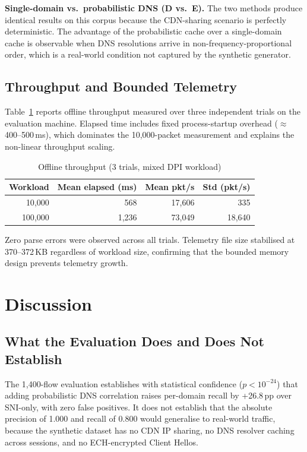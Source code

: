 \documentclass[conference]{IEEEtran}
\begin{document}
\textbf{Single-domain vs.\ probabilistic DNS (D vs.\ E).} The two
methods produce identical results on this corpus because the
CDN-sharing scenario is perfectly deterministic.
The advantage of the probabilistic cache over a single-domain cache
is observable when DNS resolutions arrive in non-frequency-proportional
order, which is a real-world condition not captured by the synthetic
generator.

\subsection{Throughput and Bounded Telemetry}

Table~\ref{tab:bench} reports offline throughput measured over
three independent trials on the evaluation machine.
Elapsed time includes fixed process-startup overhead
($\approx$400--500\,ms), which dominates the 10{,}000-packet
measurement and explains the non-linear throughput scaling.

\begin{table}[!t]
\centering
\caption{Offline throughput (3 trials, mixed DPI workload)}
\label{tab:bench}
\scriptsize
\begin{tabular}{|r|r|r|r|}
\hline
\textbf{Workload} & \textbf{Mean elapsed (ms)} & \textbf{Mean pkt/s} & \textbf{Std (pkt/s)} \\
\hline
10{,}000 & 568 & 17{,}606 & 335 \\
\hline
100{,}000 & 1{,}236 & 73{,}049 & 18{,}640 \\
\hline
\end{tabular}
\end{table}

Zero parse errors were observed across all trials.
Telemetry file size stabilised at 370--372\,KB regardless of workload
size, confirming that the bounded memory design prevents telemetry growth.

\section{Discussion}

\subsection{What the Evaluation Does and Does Not Establish}

The 1,400-flow evaluation establishes with statistical confidence
($p < 10^{-24}$) that adding probabilistic DNS correlation raises
per-domain recall by +26.8\,pp over SNI-only, with zero false positives.
It does not establish that the absolute precision of 1.000 and
recall of 0.800 would generalise to real-world traffic, because the
synthetic dataset has no CDN IP sharing, no DNS resolver caching
across sessions, and no ECH-encrypted Client Hellos.
\end{document}
